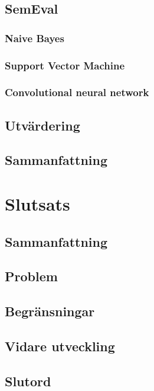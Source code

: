 \documentclass{kaumasters} %
\begin{document}
\section{SemEval}
\subsection{Naive Bayes}
\subsection{Support Vector Machine}
\subsection{Convolutional neural network}
\section{Utvärdering}
\section{Sammanfattning}

\chapter{Slutsats}
\section{Sammanfattning}
\section{Problem}
\section{Begränsningar}
\newpage
\section{Vidare utveckling}
\section{Slutord}



 



\restoregeometry%
\end{document}

